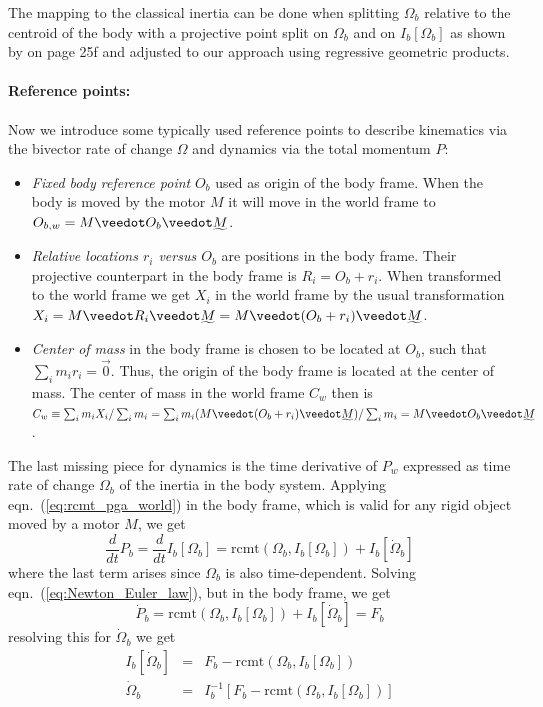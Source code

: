 The mapping to the classical inertia can be done when splitting $\Omega_b$ relative to
the centroid of the body with a projective point split on $\Omega_b$ and on
$I_b[\Omega_b]$ as shown by \cite{Dynamics_in_PGA_plane-based_Dorst-DeKennik:2023} on page
25f and adjusted to our approach using regressive geometric products.

\paragraph{Reference points:}
Now we introduce some typically used reference points to describe kinematics via the
bivector rate of change $\Omega$ and dynamics via the total momentum $P$:
\begin{itemize}
    \item \emph{Fixed body reference point} $O_b$ used as origin of the body frame. When
    the body is moved by the motor $M$ it will move in the world frame to $O_{b,w} = M
    \veedot O_b \veedot \rrev{M}$.
    \item \emph{Relative locations $r_i$ versus $O_b$} are positions in the body frame.
    Their projective counterpart in the body frame is $R_i = O_b + r_i$. When transformed
    to the world frame we get $X_i$ in the world frame by the usual transformation $X_i =
    M \veedot R_i \veedot \rrev{M} = M \veedot (O_b + r_i) \veedot \rrev{M}$.
    \item \emph{Center of mass} in the body frame is chosen to be located at $O_b$, such
    that $\sum_i{m_i r_i} = \vec{0}$. Thus, the origin of the body frame is located at the
    center of mass. The center of mass in the world frame $C_w$ then is $C_w \equiv
    \sum_i{m_i X_i} / \sum_i{m_i} = \sum_i{m_i (M \veedot (O_b + r_i) \veedot \rrev{M})} /
    \sum_i{m_i} = M \veedot O_b \veedot \rrev{M}$.
\end{itemize}

The last missing piece for dynamics is the time derivative of $P_{w}$ expressed as time
rate of change $\Omega_b$ of the inertia in the body system. Applying
eqn.~(\ref{eq:rcmt_pga_world}) in the body frame, which is valid for any rigid object
moved by a motor $M$, we get
\begin{equation}
    \frac{d}{dt} P_b = \frac{d}{dt} I_b[\Omega_b] =
    \mathrm{rcmt}(\Omega_b,I_b[\Omega_b]) + I_b[\dot{\Omega}_b]
\end{equation}
where the last term arises since $\Omega_b$ is also time-dependent. Solving
eqn.~(\ref{eq:Newton_Euler_law}), but in the body frame, we get
\begin{equation}
    \dot{P}_b = \mathrm{rcmt}(\Omega_b,I_b[\Omega_b]) + I_b[\dot{\Omega}_b] = F_b
\end{equation}
resolving this for $\dot{\Omega}_b$ we get
\begin{eqnarray}
    I_b[\dot{\Omega}_b] &=& F_{b} - \mathrm{rcmt}(\Omega_b,I_b[\Omega_b]) \\[5pt]
    \dot{\Omega}_b &=& I_b^{-1}\left[ F_{b} - \mathrm{rcmt}(\Omega_b,I_b[\Omega_b])
    \right]
\end{eqnarray}

